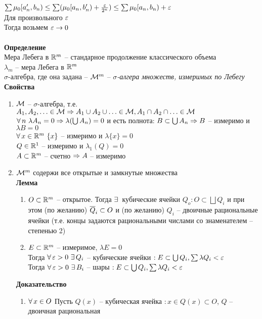 \documentclass[12pt]{article}
\begin{document}
$\sum \mu_0 [a_n', b_n) \leq \sum (\mu_0[a_n, b_n') + \frac{\varepsilon}{2^n}) \leq \sum \mu_0[a_n, b_n) + \varepsilon$\\
Для произвольного $\varepsilon$\\
Тогда возьмем $\varepsilon \rightarrow 0$\\\\
\textbf{Определение}\\
Мера Лебега в $\mathbb{R}^m$ -- стандарное продолжение классического объема\\
$\lambda_m$ -- мера Лебега в $\mathbb{R}^m$\\
$\sigma$-алгебра, где она задана -- $\mathcal M^m$ -- \textit{$\sigma$-алгера множеств, измеримых по Лебегу}\\
\textbf{Свойства}
\begin{enumerate}
    \item $\mathcal M$ -- $\sigma$-алгебра, т.е. $A_1, A_2, \ldots \in \mathcal M \Rightarrow A_1 \cup A_2 \cup \ldots \in \mathcal M, A_1 \cap A_2 \cap \ldots \in \mathcal M$\\
    $\forall\, n\ \lambda A_n = 0 \Rightarrow \lambda(\bigcup A_n) = 0$ и есть полнота: $B \subset \bigcup A_n \Rightarrow B$ -- измеримо и $\lambda B = 0$\\
    $\forall\, x \in \mathbb{R}^m\ \{x\}$ -- измеримо и $\lambda\{x\} = 0$\\
    $Q \in \mathbb{R}^1$ -- измеримо и $\lambda_1(Q) = 0$\\
    $A \subset \mathbb{R}^m$ -- счетно $\Rightarrow A$ -- измеримо
    \item $\mathcal M^m$ содержи все открытые и замкнутые множества\\
    \textbf{Лемма}
    \begin{enumerate}
        \item $O \subset \mathbb{R}^m$ -- открытое. Тогда $\exists\,$ кубические ячейки $Q_o: O \subset \bigsqcup Q_i$ и при этом (по желанию) $\overline Q_i \subset O$ и (по желанию) $Q_i$ -- двоичные рациональные ячейки (т.е. концы задаются рациональными числами со знаменателем -- степенью 2)
        \item $E \subset \mathbb{R}^m$ -- измеримое, $\lambda E = 0$\\
        Тогда $\forall\, \varepsilon > 0\ \exists\, Q_i$ -- кубические ячейки $: E \subset \bigcup Q_i, \sum \lambda Q_i < \varepsilon$\\
        Тогда $\forall\, \varepsilon > 0\ \exists\, B_i$ -- шары $: E \subset \bigcup Q_i, \sum \lambda Q_i < \varepsilon$
    \end{enumerate}
    \textbf{Доказательство}\begin{enumerate}
        \item $\forall\, x \in O$ Пусть $Q(x)$ -- кубическая ячейка $: x \in Q(x) \subset O$, $Q$ -- двоичная рациональная\\

\end{enumerate}
\end{enumerate}
\end{document}
